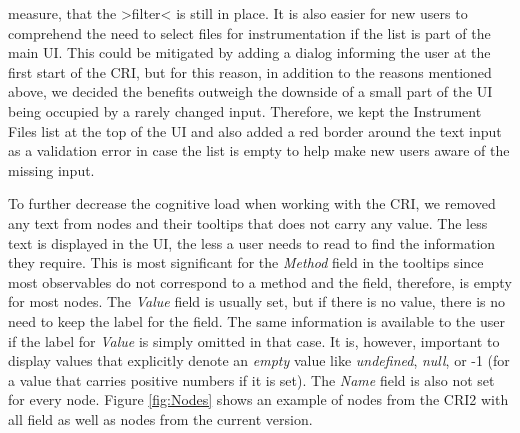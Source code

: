 measure, that the >filter< is still in place. It is also easier for new users to comprehend the need to select files for instrumentation if the list is part of the main UI. This could be mitigated by adding a dialog informing the user at the first start of the CRI, but for this reason, in addition to the reasons mentioned above, we decided the benefits outweigh the downside of a small part of the UI being occupied by a rarely changed input. Therefore, we kept the Instrument Files list at the top of the UI and also added a red border around the text input as a validation error in case the list is empty to help make new users aware of the missing input.

To further decrease the cognitive load when working with the CRI, we removed any text from nodes and their tooltips that does not carry any value. The less text is displayed in the UI, the less a user needs to read to find the information they require. This is most significant for the \emph{Method} field in the tooltips since most observables do not correspond to a method and the field, therefore, is empty for most nodes. The \emph{Value} field is usually set, but if there is no value, there is no need to keep the label for the field. The same information is available to the user if the label for \emph{Value} is simply omitted in that case.
It is, however, important to display values that explicitly denote an \emph{empty} value like \emph{undefined}, \emph{null}, or -1 (for a value that carries positive numbers if it is set). The \emph{Name} field is also not set for every node. Figure \ref{fig:Nodes} shows an example of nodes from the CRI2 with all field as well as nodes from the current version.

